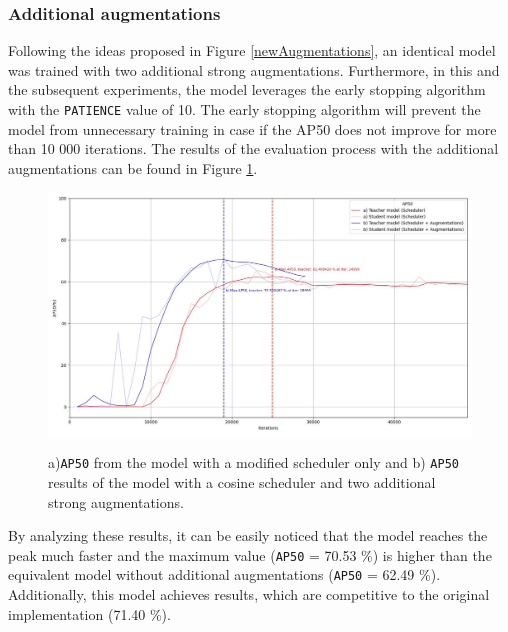 \subsubsection{Additional augmentations}
\label{augmentations_section} 
Following the ideas proposed in Figure \ref{newAugmentations}, an identical model was trained with two additional strong augmentations. Furthermore, in this and the subsequent  experiments, the model leverages the early stopping algorithm with the \texttt{PATIENCE} value of 10. The early stopping algorithm will prevent the model from unnecessary training in case if the AP50 does not improve for more than 10 000 iterations. The results of the evaluation process with the additional augmentations can be found in Figure \ref{augmentation_experiment}. 
 
\begin{figure}[htb]
	\begin{center}
		\includegraphics[width=14cm]{./AP50_augmentation.jpg}
	\end{center}
	\caption{a)\texttt{AP50} from the model with a modified scheduler only and b) \texttt{AP50} results of the model with a cosine scheduler and two additional strong augmentations.}
	\begin{center}
		\label{augmentation_experiment}
	\end{center}
\end{figure}
\FloatBarrier  

By analyzing these results, it can be easily noticed that the model reaches the peak much faster and the maximum value (\texttt{AP50} = 70.53 \%) is higher than the equivalent model without additional augmentations (\texttt{AP50} = 62.49 \%). Additionally, this model achieves results, which are competitive to the original implementation (71.40 \%).


